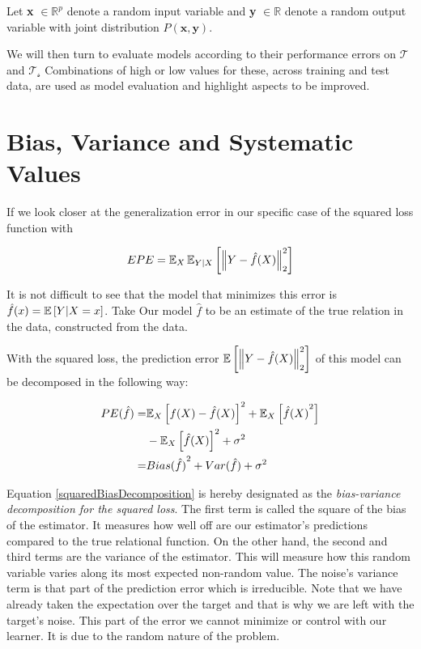 Let \textbf{x} $\in \mathbb{R}^{p}$ denote a random input variable and \textbf{y} $\in \mathbb{R}$ denote a random output variable with joint distribution $P\left(\textbf{x},\textbf{y}\right)$.

We will then turn to evaluate models according to their performance errors on $\mathcal{T}$ and $\mathcal{T_s}$ Combinations of high or low values for these, across training and test data, are used as model evaluation and highlight aspects to be improved.

\section{Bias, Variance and Systematic Values}\label{subsection-biasVariance}	If we look closer at the generalization error in our specific case of the squared loss function with

\begin{equation}\label{squaredPE}
EPE = \operatorname{\mathbb{E}}_X \operatorname{\mathbb{E}}_{Y|X} \left[ \left\Vert Y - \hat{f}(X) \right\Vert_2^2 \right]
\end{equation}

It is not difficult to see that the model that minimizes this error is $\hat{f}(x) = \operatorname{\mathbb{E}} \left[ Y | X=x \right] $. Take Our model $\hat{f}$ to be an estimate of the true relation in the data, constructed from the data.

With the squared loss, the prediction error $\operatorname{\mathbb{E}} \left[ \left\Vert Y - \hat{f}(X) \right\Vert_2^2 \right]$ of this model can be decomposed in the following way:

\begin{equation}\label{squaredBiasDecomposition}
\begin{split}
PE( \hat{f} ) = & {\operatorname{\mathbb{E}}_X \left[  f(X) - \hat{f}(X) \right]}^2 + \operatorname{\mathbb{E}}_X \left[ {\hat{f}(X)}^2 \right] \\
& - {\operatorname{\mathbb{E}}_X \left[ \hat{f}(X) \right] }^2 + \sigma^2 \\
= & {Bias(\hat{f})}^2 + Var(\hat{f}) + \sigma^2
\end{split}
\end{equation}


Equation \cref{squaredBiasDecomposition} is hereby designated as the \textit{bias-variance decomposition for the squared loss}. The first term is called the square of the bias of the estimator. It measures how well off are our estimator's predictions compared to the true relational function. On the other hand, the second and third terms are the variance of the estimator. This will measure how this random variable varies along its most expected non-random value. The noise's variance term is that part of the prediction error which is irreducible. Note that we have already taken the expectation over the target and that is why we are left with the target's noise. This part of the error we cannot minimize or control with our learner. It is due to the random nature of the problem.

